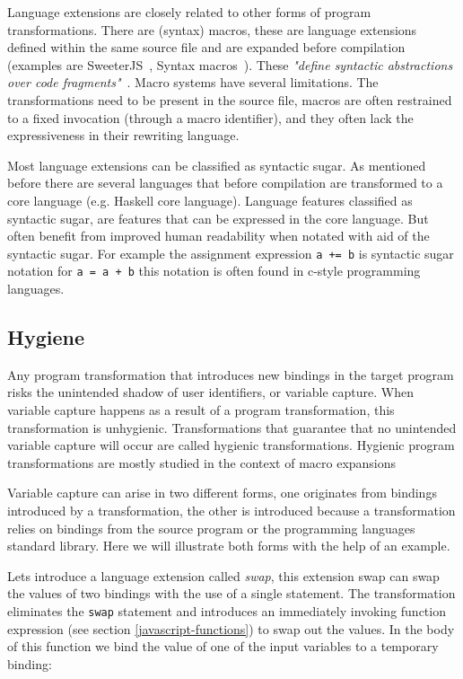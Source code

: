 Language extensions are closely related to other forms of program transformations. There are (syntax) macros\cite{Leavenworth1966}, these are language extensions defined within the same source file and are expanded before compilation (examples are SweeterJS~\cite{Disney2014}, Syntax macros~\cite{Weise1993}). These \textit{"define syntactic abstractions over code fragments"}~\cite{Bravenboer2004}. Macro systems have several limitations. The transformations need to be present in the source file, macros are often restrained to a fixed invocation (through a macro identifier), and they often lack the expressiveness in their rewriting language\cite{Bravenboer2004}.

Most language extensions can be classified as syntactic sugar. As mentioned before there are several languages that before compilation are transformed to a core language (e.g. Haskell core language).  Language features classified as syntactic sugar, are features that can be expressed in the core language. But often benefit from improved human readability when notated with aid of the syntactic sugar. For example the assignment expression \lstinline$a += b$ is syntactic sugar notation for \lstinline$a = a + b$ this notation is often found in c-style programming languages.

\subsection{Hygiene} \label{hygiene}
Any program transformation that introduces new bindings in the target program risks the unintended shadow of user identifiers, or variable capture. When variable capture happens as a result of a program transformation, this transformation is unhygienic. Transformations that guarantee that no unintended variable capture will occur are called hygienic transformations. Hygienic program transformations are mostly studied in the context of macro expansions~\cite{Herman2010a,Herman2010,Disney2014}

Variable capture can arise in two different forms, one originates from bindings introduced by a transformation, the other is introduced because a transformation relies on bindings from the source program or the programming languages standard library. Here we will illustrate both forms with the help of an example.

Lets introduce a language extension called \textit{swap}, this extension swap can swap the values of two bindings with the use of a single statement. The transformation eliminates the \lstinline$swap$ statement and introduces an immediately invoking function expression (see section \ref{javascript-functions}) to swap out the values. In the body of this function we bind the value of one of the input variables to a temporary binding:

